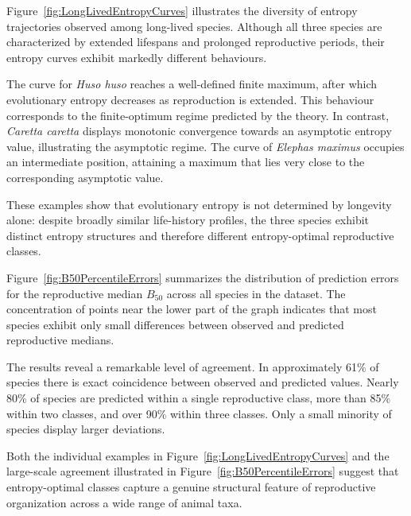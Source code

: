 \documentclass[10pt,a4paper]{amsart}
\theoremstyle{definition}
\theoremstyle{remark}
\numberwithin{equation}{section}
\begin{document}
Figure~\ref{fig:LongLivedEntropyCurves} illustrates the diversity of
entropy trajectories observed among long-lived species. Although all
three species are characterized by extended lifespans and prolonged
reproductive periods, their entropy curves exhibit markedly different
behaviours.

The curve for \emph{Huso huso} reaches a well-defined finite maximum,
after which evolutionary entropy decreases as reproduction is extended.
This behaviour corresponds to the finite-optimum regime predicted by
the theory. In contrast, \emph{Caretta caretta} displays monotonic
convergence towards an asymptotic entropy value, illustrating the
asymptotic regime. The curve of \emph{Elephas maximus} occupies an
intermediate position, attaining a maximum that lies very close to the
corresponding asymptotic value.

These examples show that evolutionary entropy is not determined by
longevity alone: despite broadly similar life-history profiles, the
three species exhibit distinct entropy structures and therefore
different entropy-optimal reproductive classes.

Figure~\ref{fig:B50PercentileErrors} summarizes the distribution of
prediction errors for the reproductive median $B_{50}$ across all
species in the dataset. The concentration of points near the lower part
of the graph indicates that most species exhibit only small differences
between observed and predicted reproductive medians.

The results reveal a remarkable level of agreement. In approximately 61\% of species there is exact coincidence between observed and predicted values. Nearly 80\% of species are predicted within a single reproductive class, more than 85\% within two classes, and over 90\% within three classes. Only a small minority of species display larger deviations.

Both the individual examples in Figure~\ref{fig:LongLivedEntropyCurves} and the large-scale agreement illustrated in Figure~\ref{fig:B50PercentileErrors} suggest that entropy-optimal classes capture a genuine structural feature of reproductive organization across a wide range of animal taxa.


%
%
\end{document}
